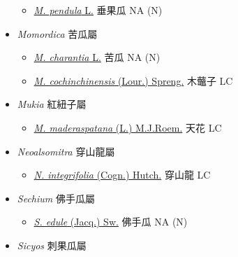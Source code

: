 \begin{itemize}
  \begin{itemize}
        \item[] \href{http://www.theplantlist.org/tpl1.1/search?q=Melothria+pendula}{\textit{M. pendula} L.}   垂果瓜   NA (N)
  \end{itemize}
 \item[] \textit{Momordica} 苦瓜屬
                                
  \begin{itemize}
        \item[] \href{http://www.theplantlist.org/tpl1.1/search?q=Momordica+charantia}{\textit{M. charantia} L.}   苦瓜   NA (N)
        \item[] \href{http://www.theplantlist.org/tpl1.1/search?q=Momordica+cochinchinensis}{\textit{M. cochinchinensis} (Lour.) Spreng.}   木虌子   LC
  \end{itemize}
 \item[] \textit{Mukia} 紅紐子屬
                                
  \begin{itemize}
        \item[] \href{http://www.theplantlist.org/tpl1.1/search?q=Mukia+maderaspatana}{\textit{M. maderaspatana} (L.) M.J.Roem.}   天花   LC
  \end{itemize}
 \item[] \textit{Neoalsomitra} 穿山龍屬
                                
  \begin{itemize}
        \item[] \href{http://www.theplantlist.org/tpl1.1/search?q=Neoalsomitra+integrifolia}{\textit{N. integrifolia} (Cogn.) Hutch.}   穿山龍   LC
  \end{itemize}
 \item[] \textit{Sechium} 佛手瓜屬
                                
  \begin{itemize}
        \item[] \href{http://www.theplantlist.org/tpl1.1/search?q=Sechium+edule}{\textit{S. edule} (Jacq.) Sw.}   佛手瓜   NA (N)
  \end{itemize}
 \item[] \textit{Sicyos} 刺果瓜屬
                                

\end{itemize}
